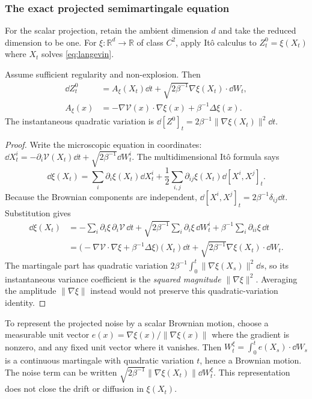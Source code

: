 \documentclass[12pt,a4paper,oneside]{book}
\begin{document}
\subsubsection{The exact projected semimartingale equation}
For the scalar projection, retain the ambient dimension $d$ and take the reduced dimension to be one. For $\xi:\mathbb R^d\to\mathbb R$ of class $C^2$, apply It\^o calculus to
$Z_t^0=\xi(X_t)$ where $X_t$ solves \eqref{eq:langevin}.

\begin{theorem}
\label{thm:itoxi}
\label{src:p13q2}
Assume sufficient regularity and non-explosion. Then
\begin{equation*}
\begin{aligned}
\dd Z_t^0&=A_\xi(X_t)\dd t
 +\sqrt{2\beta^{-1}}\nabla\xi(X_t)\cdot\dd W_t,\\
 A_\xi(x)&=-\nabla\mathcal V(x)\cdot\nabla\xi(x)+\beta^{-1}\Delta\xi(x).
\end{aligned}
\end{equation*}
The instantaneous quadratic variation is
$\dd[Z^0]_t=2\beta^{-1}\|\nabla\xi(X_t)\|^2\dd t$.
\end{theorem}
\begin{proof}
Write the microscopic equation in coordinates:
$\dd X_t^i=-\partial_i\mathcal V(X_t)\dd t+
\sqrt{2\beta^{-1}}\dd W_t^i$.
The multidimensional It\^o formula says
\begin{equation*}
\dd\xi(X_t)=\sum_i\partial_i\xi(X_t)\dd X_t^i
+\frac12\sum_{i,j}\partial_{ij}\xi(X_t)\dd[X^i,X^j]_t.
\end{equation*}
Because the Brownian components are independent,
$\dd[X^i,X^j]_t=2\beta^{-1}\delta_{ij}\dd t$.
Substitution gives
\begin{equation*}
\begin{aligned}
\dd\xi(X_t)&=-\sum_i\partial_i\xi\,\partial_i\mathcal V\,\dd t
+\sqrt{2\beta^{-1}}\sum_i\partial_i\xi\,\dd W_t^i
+\beta^{-1}\sum_i\partial_{ii}\xi\,\dd t\\
&=\bigl(-\nabla\mathcal V\cdot\nabla\xi+\beta^{-1}\Delta\xi\bigr)(X_t)\dd t
+\sqrt{2\beta^{-1}}\nabla\xi(X_t)\cdot\dd W_t.
\end{aligned}
\end{equation*}
The martingale part has quadratic variation
$2\beta^{-1}\int_0^t\|\nabla\xi(X_s)\|^2\dd s$, so its
instantaneous variance coefficient is the \emph{squared magnitude}
$\|\nabla\xi\|^2$. Averaging the amplitude $\|\nabla\xi\|$ instead
would not preserve this quadratic-variation identity.
\end{proof}
To represent the projected noise by a scalar Brownian motion, choose a
measurable unit vector $e(x)=\nabla\xi(x)/\|\nabla\xi(x)\|$ where the
gradient is nonzero, and any fixed unit vector where it vanishes.
Then $W_t^\xi=\int_0^te(X_s)\cdot\dd W_s$ is a continuous martingale
with quadratic variation $t$, hence a Brownian motion. The noise term
can be written $\sqrt{2\beta^{-1}}\|\nabla\xi(X_t)\|\dd W_t^\xi$.
This representation does not close the drift or diffusion in $\xi(X_t)$.
\end{document}
